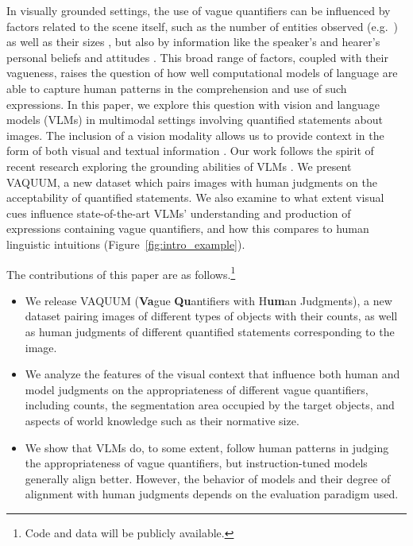 In visually grounded settings, the use of vague quantifiers can be influenced by factors related to the scene itself, such as the number of entities observed (e.g.\ \citealp{coventry2005-grounding}) as well as their sizes \citep{hormann1983-calculating,coventry2010-space}, but also by information like the speaker's and hearer's personal beliefs and attitudes \citep{moxey2000-quantities,jucker2003-vagueness}. This broad range of factors, coupled with their vagueness,
raises the question of how well computational models of language are able to capture human patterns in the comprehension and use of such expressions. In this paper, we explore this question with vision and language models (VLMs) in multimodal settings involving quantified statements about images.
The inclusion of a vision modality allows us to provide context in the form of both visual and textual information \citep{zhang2024-vlsurvey,ghosh2024-frontier}. Our work follows the spirit of recent research exploring the grounding abilities of VLMs
\cite[e.g.][]{zellers2019-visualcommonsense,thrush2022-winoground,zhang2022-commonsense,parcalabescu2022-valse,chen_bla_2023,kamath_hard_2024,wang_mementos_2024}. 
We present VAQUUM, a new dataset which pairs images with human judgments on the acceptability of quantified statements. We also examine to what extent visual cues influence state-of-the-art VLMs' understanding and production of expressions containing vague quantifiers, and how this compares to human linguistic intuitions (Figure~\ref{fig:intro_example}).

The contributions of this paper are as follows.\footnote{Code and data will be publicly available.}

\begin{itemize}
    \item We release VAQUUM (\textbf{Va}gue \textbf{Qu}antifiers with H\textbf{um}an Judgments), a new dataset pairing images of different types of objects with their counts, as well as human judgments of different quantified statements corresponding to the image. 
    \item We analyze the features of the visual context that influence both human and model judgments on the appropriateness of different vague quantifiers, including counts, the segmentation area occupied by the target objects, and aspects of world knowledge such as their normative size.
    \item We show that VLMs do, to some extent, follow human patterns in judging the appropriateness of vague quantifiers, but instruction-tuned models generally align better. However, the behavior of models and their degree of alignment with human judgments depends on the evaluation paradigm used. 
\end{itemize}